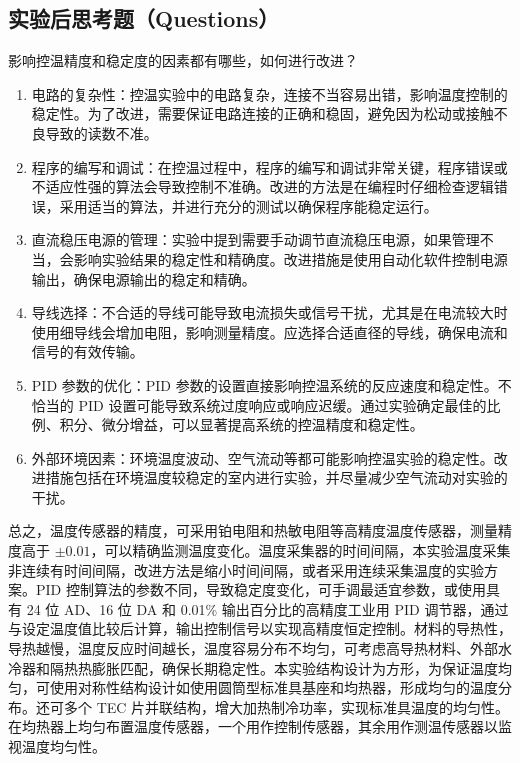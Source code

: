 \documentclass[dvipsnames, svgnames,a4paper,11pt]{article}
\begin{document}
	
	\subsection{实验后思考题（Questions）}
	
	\begin{question}
		影响控温精度和稳定度的因素都有哪些，如何进行改进？
	\end{question}
	\begin{enumerate}
		\item 电路的复杂性：控温实验中的电路复杂，连接不当容易出错，影响温度控制的稳定性。为了改进，需要保证电路连接的正确和稳固，避免因为松动或接触不良导致的读数不准。
		\item 程序的编写和调试：在控温过程中，程序的编写和调试非常关键，程序错误或不适应性强的算法会导致控制不准确。改进的方法是在编程时仔细检查逻辑错误，采用适当的算法，并进行充分的测试以确保程序能稳定运行。
		\item 直流稳压电源的管理：实验中提到需要手动调节直流稳压电源，如果管理不当，会影响实验结果的稳定性和精确度。改进措施是使用自动化软件控制电源输出，确保电源输出的稳定和精确。
		\item 导线选择：不合适的导线可能导致电流损失或信号干扰，尤其是在电流较大时使用细导线会增加电阻，影响测量精度。应选择合适直径的导线，确保电流和信号的有效传输。
		\item PID 参数的优化：PID 参数的设置直接影响控温系统的反应速度和稳定性。不恰当的 PID 设置可能导致系统过度响应或响应迟缓。通过实验确定最佳的比例、积分、微分增益，可以显著提高系统的控温精度和稳定性。
		\item 外部环境因素：环境温度波动、空气流动等都可能影响控温实验的稳定性。改进措施包括在环境温度较稳定的室内进行实验，并尽量减少空气流动对实验的干扰。
	\end{enumerate}
	
	总之，温度传感器的精度，可采用铂电阻和热敏电阻等高精度温度传感器，测量精度高于 $\pm0.01$\degree，可以精确监测温度变化。温度采集器的时间间隔，本实验温度采集非连续有时间间隔，改进方法是缩小时间间隔，或者采用连续采集温度的实验方案。PID 控制算法的参数不同，导致稳定度变化，可手调最适宜参数，或使用具有 24 位 AD、16 位 DA 和 0.01\% 输出百分比的高精度工业用 PID 调节器，通过与设定温度值比较后计算，输出控制信号以实现高精度恒定控制。材料的导热性，导热越慢，温度反应时间越长，温度容易分布不均匀，可考虑高导热材料、外部水冷器和隔热热膨胀匹配，确保长期稳定性。本实验结构设计为方形，为保证温度均匀，可使用对称性结构设计如使用圆筒型标准具基座和均热器，形成均匀的温度分布。还可多个 TEC 片并联结构，增大加热制冷功率，实现标准具温度的均匀性。在均热器上均匀布置温度传感器，一个用作控制传感器，其余用作测温传感器以监视温度均匀性。
	
\end{document}
